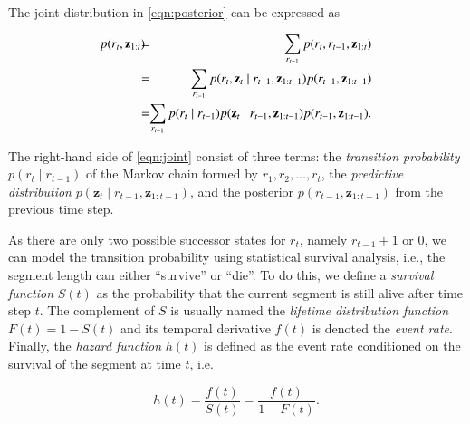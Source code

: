 The joint distribution in \eqref{eqn:posterior} can be expressed as

\begin{eqnarray}
\label{eqn:joint}
p(r_t,\mathbf{z}_{1:t}) \hspace{-0.2cm}&=& \hspace{-0.35cm} \sum_{r_{t-1}}p(r_t,r_{t-1},\mathbf{z}_{1:t})\nonumber\\
               &=& \hspace{-0.35cm} \sum_{r_{t-1}}p(r_t,\mathbf{z}_t\mid r_{t-1},\mathbf{z}_{1:t-1})p(r_{t-1},
                   \mathbf{z}_{1:t-1})\nonumber\\
             &  = &  \hspace{-0.35cm}
             \sum_{r_{t-1}}p(r_t\mid r_{t-1})p(\mathbf{z}_t\mid r_{t-1},\mathbf{z}_{1:t-1})p(r_{t-1},\mathbf{z}_{1:t-1}).
\end{eqnarray}

The right-hand side of \eqref{eqn:joint} consist of three terms: the
\emph{transition probability} $p(r_t\mid r_{t-1})$ of the Markov chain formed by
$r_1,r_2,\dots,r_t$, the \emph{predictive distribution}
$p(\mathbf{z}_t\mid r_{t-1},\mathbf{z}_{1:t-1})$, and the posterior
$p(r_{t-1},\mathbf{z}_{1:t-1})$ from the previous time step.


As there are only two possible successor states for $r_t$, namely
\mbox{$r_{t-1}+1$} or $0$, we can model the transition probability using
statistical survival analysis, i.e., the segment length can
either ``survive'' or ``die''. To do this, we define a \emph{survival function}
$S(t)$ as the probability that the current segment is still alive after time
step $t$. The complement of $S$ is usually named the
\emph{lifetime distribution function} $F(t)= 1- S(t)$ and its temporal
derivative $f(t)$ is denoted the \emph{event rate}. Finally, the
\emph{hazard function} $h(t)$ is defined as the event rate conditioned on the
survival of the segment at time $t$, i.e.

\begin{equation}
\label{eqn:hazardfunc}
h(t) = \frac{f(t)}{S(t)} = \frac{f(t)}{1 - F(t)}.
\end{equation}

